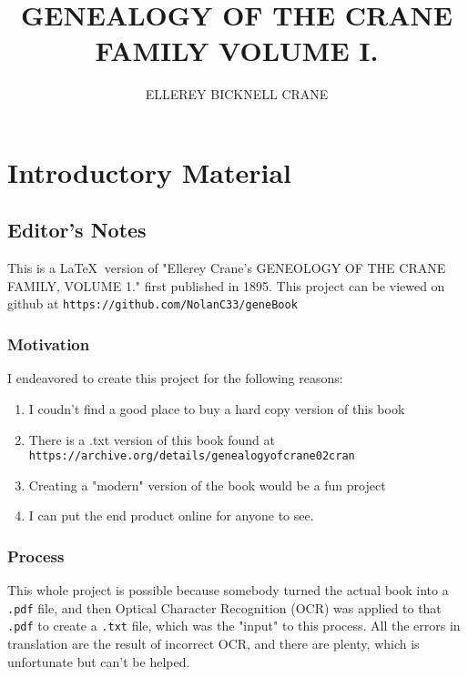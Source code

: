 \documentclass[oneside]{book}
\begin{document}
\title{GENEALOGY OF THE CRANE FAMILY VOLUME I.}
\author{ELLEREY BICKNELL CRANE}

\maketitle
\tableofcontents

\chapter{Introductory Material}

\section{Editor's Notes}

This is a \LaTeX $\:$ version of "Ellerey Crane's GENEOLOGY OF THE CRANE FAMILY, VOLUME 1." first published in 1895. This project can be viewed on github at \texttt{https://github.com/NolanC33/geneBook}

\subsection{Motivation}

I endeavored to create this project for the following reasons: 

\begin{enumerate}
\item I coudn't find a good place to buy a hard copy version of this book
\item There is a .txt version of this book found at \texttt{https://archive.org/details/genealogyofcrane02cran}
\item Creating a "modern" version of the book would be a fun project
\item I can put the end product online for anyone to see. 
\end{enumerate}

\subsection{Process}

This whole project is possible because somebody turned the actual book into a \texttt{.pdf} file, and then Optical Character Recognition (OCR) was applied to that \texttt{.pdf} to create a \texttt{.txt} file, which was the "input" to this process. All the errors in translation are the result of incorrect OCR, and there are plenty, which is unfortunate but can't be helped. 
\end{document}
